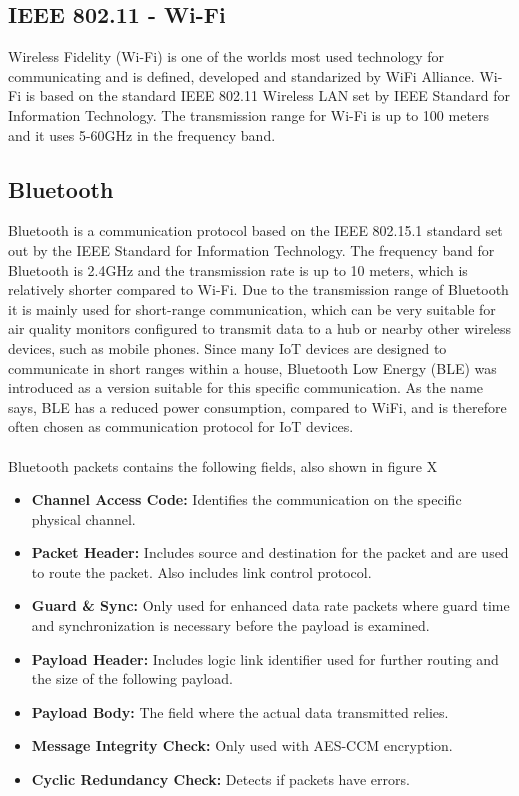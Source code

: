 \subsection*{IEEE 802.11 - Wi-Fi}
Wireless Fidelity (Wi-Fi) \cite{WiFiAlliance} is one of the worlds most used technology for communicating and is defined, developed and standarized by WiFi Alliance. \cite{WiFiAlliance} Wi-Fi is based on the standard IEEE 802.11 Wireless LAN set by IEEE Standard for Information Technology. \cite{WifiStandard} The transmission range for Wi-Fi is up to 100 meters and it uses 5-60GHz in the frequency band. \cite{IAQMonitorCommunicationReview}

\subsection*{Bluetooth}
Bluetooth is a communication protocol based on the IEEE 802.15.1 standard set out by the IEEE Standard for Information Technology. The frequency band for Bluetooth is 2.4GHz and the transmission rate is up to 10 meters, which is relatively shorter compared to Wi-Fi. \cite{IAQMonitorCommunicationReview} Due to the transmission range of Bluetooth it is mainly used for short-range communication, which can be very suitable for air quality monitors configured to transmit data to a hub or nearby other wireless devices, such as mobile phones. Since many IoT devices are designed to communicate in short ranges within a house, Bluetooth Low Energy (BLE) was introduced as a version suitable for this specific communication. \cite{SecurityofCommunicationProt} As the name says, BLE has a reduced power consumption, compared to WiFi, and is therefore often chosen as communication protocol for IoT devices. 
\\\\
Bluetooth packets contains the following fields, also shown in figure X

\begin{itemize}
    \item \textbf{Channel Access Code:} Identifies the communication on the specific physical channel. 
    \item \textbf{Packet Header:} Includes source and destination for the packet and are used to route the packet. Also includes link control protocol. 
    \item \textbf{Guard & Sync:} Only used for enhanced data rate packets where guard time and synchronization is necessary before the payload is examined.
    \item \textbf{Payload Header:} Includes logic link identifier used for further routing and the size of the following payload.
    \item \textbf{Payload Body:} The field where the actual data transmitted relies. 
    \item \textbf{Message Integrity Check:} Only used with AES-CCM encryption.
    \item \textbf{Cyclic Redundancy Check:} Detects if packets have errors. 
\end{itemize}


